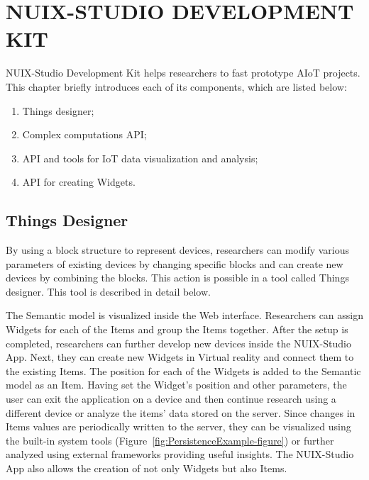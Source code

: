 
\chapter{\MakeUppercase{NUIX-Studio Development kit}}

NUIX-Studio Development Kit helps researchers to fast prototype AIoT projects. This chapter briefly introduces each of its components, which are listed below:
\begin{enumerate}
    \item Things designer;
    \item Complex computations API;
    \item API and tools for IoT data visualization and analysis;
    \item API for creating Widgets.
\end{enumerate}

\section{Things Designer}

By using a block structure to represent devices, researchers can modify various parameters of existing devices by changing specific blocks and can create new devices by combining the blocks. This action is possible in a tool called Things designer. This tool is described in detail below.

The Semantic model is visualized inside the Web interface. Researchers can assign Widgets for each of the Items and group the Items together. After the setup is completed, researchers can further develop new devices inside the NUIX-Studio App. Next, they can create new Widgets in Virtual reality and connect them to the existing Items. The position for each of the Widgets is added to the Semantic model as an Item. Having set the Widget's position and other parameters, the user can exit the application on a device and then continue research using a different device or analyze the items' data stored on the server. Since changes in Items values are periodically written to the server, they can be visualized using the built-in system tools (Figure~\ref{fig:PersistenceExample-figure}) or further analyzed using external frameworks providing useful insights. The NUIX-Studio App also allows the creation of not only Widgets but also Items.


